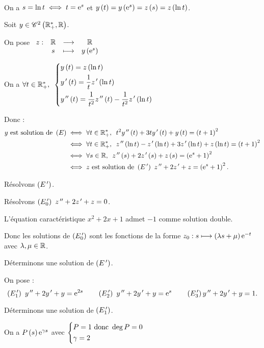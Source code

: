 \begin{corr}~\\
\begin{brouill}
On a \(s=\ln t\iff t=\mathrm{e}^{s}\) et \(y\left(t\right)=y\left(\mathrm{e}^{s}\right)=z\left(s\right)=z\left(\ln t\right)\).
\end{brouill}

Soit \(y\in\mathscr{C}^{2}\left(\mathbb{R}_+^*,\mathbb{R}\right)\).

On pose \(\begin{array}[t]{cccc}z : & \mathbb{R} & \longrightarrow & \mathbb{R} \\ & s & \longmapsto & y\left(\mathrm{e}^{s}\right)\end{array}\)

On a \(\quantifs{\forall t\in\Rps}\begin{dcases}
y\paren{t}=z\paren{\ln t} \\
y\prim\paren{t}=\dfrac{1}{t}z\prim\paren{\ln t} \\
y\seconde\paren{t}=\dfrac{1}{t^2}z\seconde\paren{t}-\dfrac{1}{t^2}z\prim\paren{\ln t}
\end{dcases}\)

Donc : \[\begin{aligned}
y\text{ est solution de }\paren{E}&\ssi\quantifs{\forall t\in\Rps}t^2y\seconde\paren{t}+3ty\prim\paren{t}+y\paren{t}=\paren{t+1}^2 \\
&\ssi\quantifs{\forall t\in\Rps}z\seconde\paren{\ln t}-z\prim\paren{\ln t}+3z\prim\paren{\ln t}+z\paren{\ln t}=\paren{t+1}^2 \\
&\ssi\quantifs{\forall s\in\R}z\seconde\paren{s}+2z\prim\paren{s}+z\paren{s}=\paren{\e{s}+1}^2 \\
&\ssi z\text{ est solution de }\paren{E\prim}~z\seconde+2z\prim+z=\paren{\e{s}+1}^2.
\end{aligned}\]

Résolvons \(\left(E^{\,\prime}\right)\).

Résolvons \(\left(E_0^{\,\prime}\right)~z^{\,\prime\prime}+2z^{\,\prime}+z=0\).

L'équation caractéristique \(x^2+2x+1\) admet \(-1\) comme solution double.

Donc les solutions de \(\left(E_0^{\,\prime}\right)\) sont les fonctions de la forme \(z_0:s\longmapsto\left(\lambda s+\mu\right)\mathrm{e}^{-t}\) avec \(\lambda,\mu\in\mathbb{R}\).

Déterminons une solution de \(\left(E^{\,\prime}\right)\).

On pose : \[\left(E_1^{\,\prime}\right)~y^{\,\prime\prime}+2y^{\,\prime}+y=\mathrm{e}^{2s}\qquad\left(E_2^{\,\prime}\right)~y^{\,\prime\prime}+2y^{\,\prime}+y=\mathrm{e}^{s}\qquad\left(E_3^{\,\prime}\right)y^{\,\prime\prime}+2y^{\,\prime}+y=1.\]

Déterminons une solution de \(\left(E_1^{\,\prime}\right)\).

\begin{brouill}
On a \(P\left(s\right)\mathrm{e}^{\gamma s}\) avec \(\begin{dcases}
P=1\text{ donc }\deg P=0 \\
\gamma=2
\end{dcases}\)


\end{brouill}
\end{corr}
